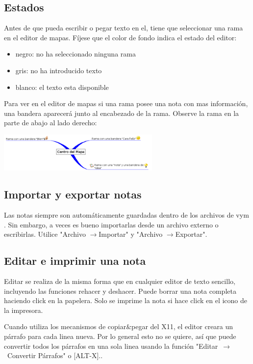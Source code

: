 \documentclass{article}
\newcommand{\vym}{{\sc vym }}
\newcommand{\ra}{$\longrightarrow$}
\newcommand{\key}[1]{[#1]}
\begin{document}
\subsection{Estados}
Antes de que pueda escribir o pegar texto en el, tiene que seleccionar una rama en el editor de mapas.  F\'ijese que el color de fondo indica el estado del editor:
\begin{itemize}
    \item negro: no ha seleccionado ninguna rama
    \item gris: no ha introducido texto
    \item blanco: el texto esta disponible
\end{itemize}   
Para ver en el editor de mapas si una rama posee una nota con mas informaci\'on, una bandera aparecer\'a junto al encabezado de la rama. Observe la rama en la parte de abajo al lado derecho:
\begin{center}
    \includegraphics[width=8cm]{images/branches-flags_es.png}
\end{center}

\subsection{Importar y exportar notas}
Las notas siempre son autom\'aticamente guardadas dentro de los archivos  de \vym. Sin embargo, a veces es bueno importarlas desde un archivo externo o escribirlas. Utilice "Archivo \ra Importar" y "Archivo \ra Exportar".

\subsection{Editar e imprimir una nota}
Editar se realiza de la misma forma que en cualquier editor de texto sencillo, incluyendo las funciones rehacer y deshacer. Puede borrar una nota completa haciendo click en la papelera. Solo se imprime la nota si hace click en el icono de la impresora.

Cuando utiliza los mecanismos de copiar\&pegar del X11, el editor creara un p\'arrafo para cada linea nueva. Por lo general esto no se quiere, as\'i que puede convertir todos los p\'arrafos en una sola linea usando la funci\'on "Editar~\ra~Convertir P\'arrafos" o \key{ALT-X}..
\end{document}
